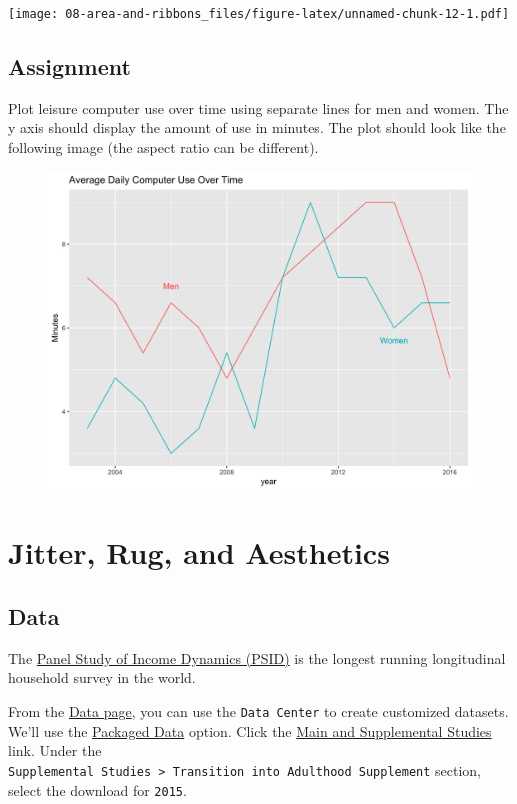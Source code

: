 \documentclass[]{book}
\theoremstyle{definition}
\theoremstyle{definition}
\theoremstyle{remark}
\begin{document}
\texttt{[image: 08-area-and-ribbons\_files/figure-latex/unnamed-chunk-12-1.pdf]}

\section{Assignment}\label{assignment-7}

Plot leisure computer use over time using separate lines for men and
women. The y axis should display the amount of use in minutes. The plot
should look like the following image (the aspect ratio can be
different).

\begin{figure}[htbp]
\centering
\includegraphics{fig/computer_use_example.png}
\caption{}
\end{figure}

\hypertarget{jitter-rug}{\chapter{Jitter, Rug, and
Aesthetics}\label{jitter-rug}}

\section{Data}\label{data-6}

The \href{https://psidonline.isr.umich.edu}{Panel Study of Income
Dynamics (PSID)} is the longest running longitudinal household survey in
the world.

From the \href{https://simba.isr.umich.edu/data/data.aspx}{Data page},
you can use the \texttt{Data\ Center} to create customized datasets.
We'll use the
\href{https://simba.isr.umich.edu/data/PackagedData.aspx}{Packaged Data}
option. Click the
\href{https://simba.isr.umich.edu/Zips/ZipMain.aspx}{Main and
Supplemental Studies} link. Under the
\texttt{Supplemental\ Studies\ \textgreater{}\ Transition\ into\ Adulthood\ Supplement}
section, select the download for \texttt{2015}.
\end{document}
